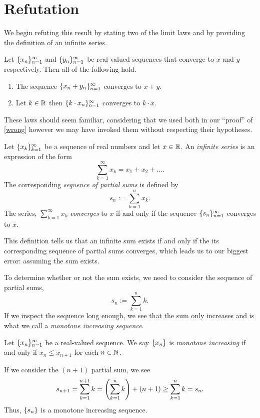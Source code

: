 \documentclass[]{simple}
\begin{document}
\section{Refutation}

We begin refuting this result by stating two of the limit laws and by providing the definition of an infinite series.
\begin{thm}
	Let $\lbrace x_n \rbrace_{n=1}^\infty$ and $\lbrace y_n \rbrace_{n=1}^\infty$ be real-valued sequences that converge to $x$ and $y$ respectively.
	Then all of the following hold.
	\begin{enumerate}
		\item The sequence $\lbrace x_n+y_n \rbrace_{n=1}^\infty$ converges to $x+y$.
		\item Let $k\in\mathbb{R}$ then $\lbrace k\cdot x_n \rbrace_{n=1}^\infty$ converges to $k\cdot x$.
	\end{enumerate}
\end{thm}
These laws should seem familiar, considering that we used both in our ``proof'' of \autoref{wrong} however we may have invoked them without respecting their hypotheses.

\begin{definition}
	Let $\lbrace x_k \rbrace_{k=1}^\infty$ be a sequence of real numbers and let $x\in\mathbb{R}$.
	An \textit{infinite series} is an expression of the form
	\[
		\sum_{k=1}^\infty x_k=x_1+x_2+\ldots.
	\]
	The corresponding \textit{sequence of partial sums} is defined by
	\[
		s_n:=\sum_{k=1}^n x_k.
	\]
	The series, $\sum_{k=1}^\infty x_k$ \textit{converges} to $x$ if and only if the sequence $\lbrace s_n \rbrace_{n=1}^\infty$ converges to $x$.
\end{definition}
This definition tells us that an infinite sum exists if and only if the its corresponding sequence of partial sums converges, which leads us to our biggest error: assuming the sum exists.

To determine whether or not the sum exists, we need to consider the sequence of partial sums,
\[
	s_n:=\sum_{k=1}^n k.
\]
If we inspect the sequence long enough, we see that the sum only increases and is what we call a \textit{monotone increasing sequence}.
\begin{definition}
	Let $\lbrace x_n \rbrace_{n=1}^\infty$ be a real-valued sequence.
	We say $\lbrace x_n \rbrace$ is \textit{monotone increasing} if and only if $x_n\leq x_{n+1}$ for each $n\in\mathbb{N}$.
\end{definition}
If we consider the $(n+1)$ partial sum, we see
\[
	s_{n+1}=\sum_{k=1}^{n+1} k = \left( \sum_{k=1}^{n} k \right) + (n+1) \geq \sum_{k=1}^{n} k=s_n.
\]
Thus, $\lbrace s_n \rbrace$ is a monotone increasing sequence.
\end{document}
